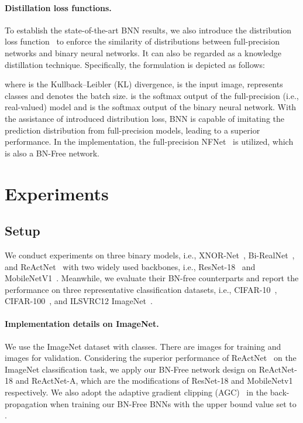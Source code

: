 \documentclass[final]{cvpr}
\begin{document}
\paragraph{Distillation loss functions.} To establish the state-of-the-art BNN results, we also introduce the distribution loss function~\cite{liu2020reactnet} to enforce the similarity of distributions between full-precision networks and binary neural networks. It can also be regarded as a knowledge distillation technique. Specifically, the formulation is depicted as follows:


where  is the Kullback–Leibler (KL) divergence,  is the input image,  represents classes and  denotes the batch size.  is the softmax output of the full-precision (i.e., real-valued) model and  is the softmax output of the binary neural network. With the assistance of introduced distribution loss, BNN is capable of imitating the prediction distribution from full-precision models, leading to a superior performance. In the implementation, the full-precision NFNet~\cite{brock2021characterizing,brock2021agc} is utilized, which is also a BN-Free network.

\section{Experiments}
\subsection{Setup}\label{sec:setup}
We conduct experiments on three binary models, i.e., XNOR-Net~\cite{rastegari2016xnor}, Bi-RealNet~\cite{liu2018bi}, and ReActNet~\cite{liu2020reactnet} with two widely used backbones, i.e., ResNet-18~\cite{he2016deep} and MobileNetV1~\cite{howard2017mobilenets}. Meanwhile, we evaluate their BN-free counterparts and report the performance on three representative classification datasets, i.e., CIFAR-10~\cite{krizhevsky2009learning}, CIFAR-100~\cite{krizhevsky2009learning}, and ILSVRC12 ImageNet~\cite{russakovsky2015imagenet}. 

\paragraph{Implementation details on ImageNet.} We use the ImageNet dataset with  classes. There are  images for training and  images for validation. Considering the superior performance of ReActNet~\cite{liu2019circulant} on the ImageNet classification task, we apply our BN-Free network design on ReActNet-18 and ReActNet-A, which are the modifications of ResNet-18 and MobileNetv1 respectively. We also adopt the adaptive gradient clipping (AGC)~\cite{brock2021agc} in the back-propagation when training our BN-Free BNNs with the upper bound value set to .
\end{document}

